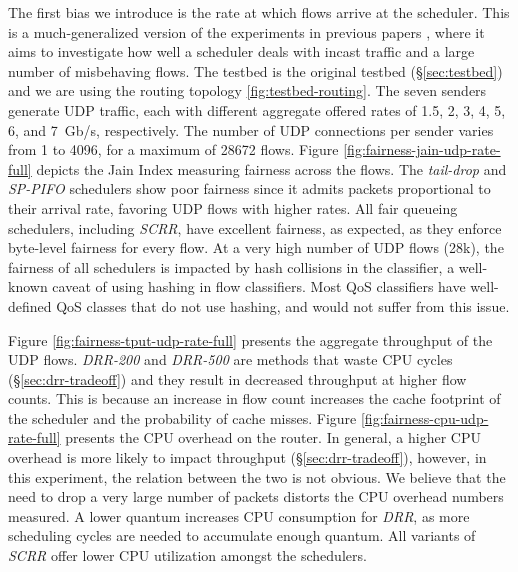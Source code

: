 The first bias we introduce is the rate at which flows arrive at the
scheduler. This is a much-generalized version of the experiments in
previous papers \cite{drr}, where it aims to investigate how well
a scheduler deals with incast traffic and a large number of
misbehaving flows. The testbed is the original testbed
(\S\ref{sec:testbed}) and we are using the routing topology
\ref{fig:testbed-routing}. The seven senders generate UDP traffic,
each with different aggregate offered rates of 1.5, 2, 3, 4, 5, 6, and
7~Gb/s, respectively. The number of UDP connections per sender varies
from 1 to 4096, for a maximum of 28672
flows. Figure \ref{fig:fairness-jain-udp-rate-full} depicts the Jain
Index measuring fairness across the flows. The \textit{tail-drop} and
\textit{SP-PIFO} schedulers show poor fairness since it admits packets
proportional to their arrival rate, favoring UDP flows with higher
rates. All fair queueing schedulers, including \textit{SCRR}, have
excellent fairness, as expected, as they enforce byte-level fairness
for every flow. At a very high number of UDP flows (28k), the fairness
of all schedulers is impacted by hash collisions in the classifier,
a well-known caveat of using hashing in flow classifiers. Most QoS
classifiers have well-defined QoS classes that do not use hashing, and
would not suffer from this issue.

Figure \ref{fig:fairness-tput-udp-rate-full} presents the aggregate
throughput of the UDP flows. \textit{DRR-200} and \textit{DRR-500} are
methods that waste CPU cycles (\S\ref{sec:drr-tradeoff}) and they result in decreased throughput at higher flow counts. This is because an increase in flow count increases the cache footprint of the scheduler and the probability of cache
misses. Figure \ref{fig:fairness-cpu-udp-rate-full} presents the CPU
overhead on the router. In general, a higher CPU overhead is more
likely to impact throughput (\S\ref{sec:drr-tradeoff}), however, in
this experiment, the relation between the two is not obvious. We
believe that the need to drop a very large number of packets distorts
the CPU overhead numbers measured. A lower quantum increases CPU
consumption for \textit{DRR}, as more scheduling cycles are needed to
accumulate enough quantum. All variants of \textit{SCRR} offer lower
CPU utilization amongst the schedulers.


